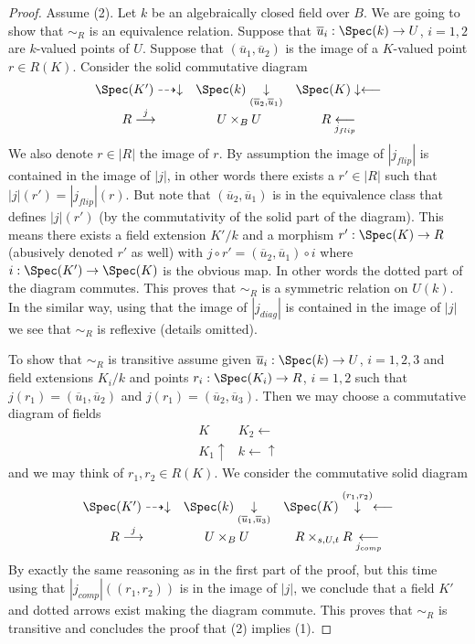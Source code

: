 \begin{proof}
Assume (2). Let $k$ be an algebraically closed field over $B$.
We are going to show that $\sim_R$ is an equivalence relation.
Suppose that $\overline{u}_i : \Spec(k) \to U$, $i = 1, 2$
are $k$-valued points of $U$. Suppose that $(\overline{u}_1, \overline{u}_2)$
is the image of a $K$-valued point $r \in R(K)$. Consider the
solid commutative diagram
$$
\begin{array}{ccc}\Spec(K') \dashrightarrow\downarrow & \Spec(k) \underset{(\overline{u}_2, \overline{u}_1)}{\downarrow} & \Spec(K) \downarrow\longleftarrow \\ R \overset{j}{\longrightarrow} & U \times_B U & R \underset{j_{flip}}{\longleftarrow}\end{array}
$$
We also denote $r \in |R|$ the image of $r$.
By assumption the image of $|j_{flip}|$ is contained in the image of
$|j|$, in other words there exists a $r' \in |R|$ such that
$|j|(r') = |j_{flip}|(r)$. But note that $(\overline{u}_2, \overline{u}_1)$
is in the equivalence class that defines $|j|(r')$ (by the commutativity
of the solid part of the diagram). This means there exists a field
extension $K'/k$ and a morphism $r' : \Spec(K) \to R$
(abusively denoted $r'$ as well) with
$j \circ r' = (\overline{u}_2, \overline{u}_1) \circ i$
where $i : \Spec(K') \to \Spec(K)$ is the obvious map.
In other words the dotted part of the diagram commutes.
This proves that $\sim_R$ is a symmetric relation on $U(k)$.
In the similar way, using that the image of $|j_{diag}|$ is contained
in the image of $|j|$ we see that $\sim_R$ is reflexive (details omitted).

\medskip\noindent
To show that $\sim_R$ is transitive assume given
$\overline{u}_i : \Spec(k) \to U$, $i = 1, 2, 3$
and field extensions $K_i/k$ and points
$r_i : \Spec(K_i) \to R$, $i = 1, 2$ such that
$j(r_1) = (\overline{u}_1, \overline{u}_2)$ and
$j(r_1) = (\overline{u}_2, \overline{u}_3)$. Then we may choose a
commutative diagram of fields
$$
\begin{array}{cc}K & K_2 \longleftarrow \\ K_1 \uparrow & k \longleftarrow\uparrow\end{array}
$$
and we may think of $r_1, r_2 \in R(K)$. We consider the
commutative solid diagram
$$
\begin{array}{ccc}\Spec(K') \dashrightarrow\downarrow & \Spec(k) \underset{(\overline{u}_1, \overline{u}_3)}{\downarrow} & \Spec(K) \overset{(r_1, r_2)}{\downarrow}\longleftarrow \\ R \overset{j}{\longrightarrow} & U \times_B U & R \times_{s, U, t} R \underset{j_{comp}}{\longleftarrow}\end{array}
$$
By exactly the same reasoning as in the first part of the proof, but
this time using that $|j_{comp}|((r_1, r_2))$ is in the image of $|j|$,
we conclude that a field $K'$ and dotted arrows exist making the
diagram commute. This proves that $\sim_R$ is transitive and concludes
the proof that (2) implies (1).


\end{proof}
